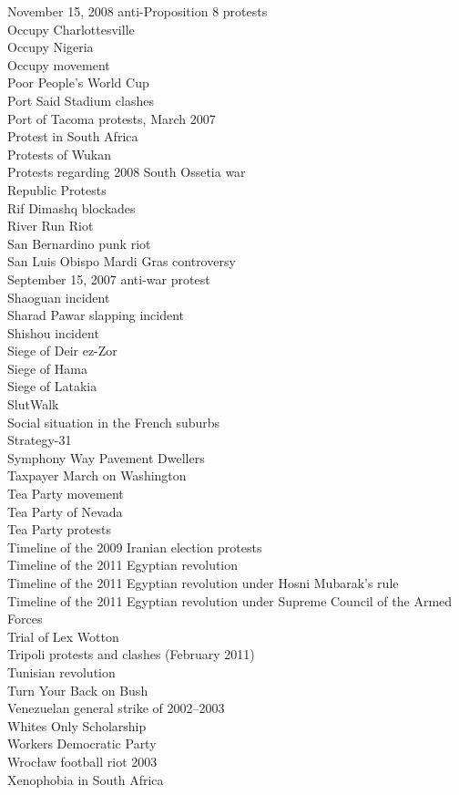 November 15, 2008 anti-Proposition 8 protests\\
Occupy Charlottesville\\
Occupy Nigeria\\
Occupy movement\\
Poor People's World Cup\\
Port Said Stadium clashes\\
Port of Tacoma protests, March 2007\\
Protest in South Africa\\
Protests of Wukan\\
Protests regarding 2008 South Ossetia war\\
Republic Protests\\
Rif Dimashq blockades\\
River Run Riot\\
San Bernardino punk riot\\
San Luis Obispo Mardi Gras controversy\\
September 15, 2007 anti-war protest\\
Shaoguan incident\\
Sharad Pawar slapping incident\\
Shishou incident\\
Siege of Deir ez-Zor\\
Siege of Hama\\
Siege of Latakia\\
SlutWalk\\
Social situation in the French suburbs\\
Strategy-31\\
Symphony Way Pavement Dwellers\\
Taxpayer March on Washington\\
Tea Party movement\\
Tea Party of Nevada\\
Tea Party protests\\
Timeline of the 2009 Iranian election protests\\
Timeline of the 2011 Egyptian revolution\\
Timeline of the 2011 Egyptian revolution under Hosni Mubarak's rule\\
Timeline of the 2011 Egyptian revolution under Supreme Council of the Armed Forces\\
Trial of Lex Wotton\\
Tripoli protests and clashes (February 2011)\\
Tunisian revolution\\
Turn Your Back on Bush\\
Venezuelan general strike of 2002–2003\\
Whites Only Scholarship\\
Workers Democratic Party\\
Wrocław football riot 2003\\
Xenophobia in South Africa\\
